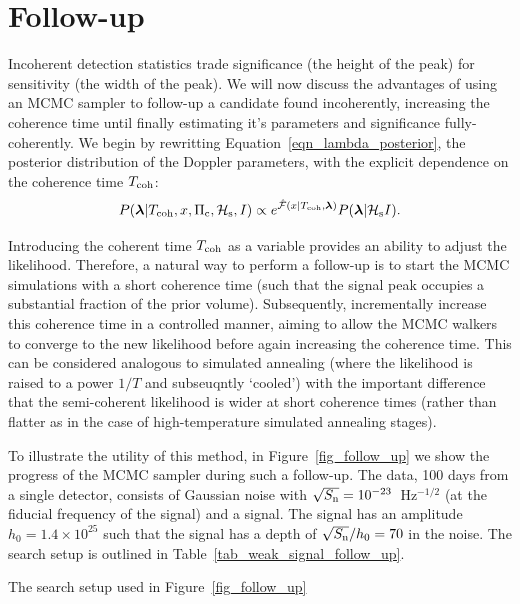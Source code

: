 \documentclass[aps, prd, twocolumn, superscriptaddress, floatfix, showpacs, nofootinbib, longbibliography]{revtex4-1}
\begin{document}
\section{Follow-up}
\label{sec_follow_up}

Incoherent detection statistics trade significance (the height of the peak) for
sensitivity (the width of the peak). We will now discuss the advantages of
using an MCMC sampler to follow-up a candidate found incoherently, increasing
the coherence time until finally estimating it's parameters and significance
fully-coherently. We begin by rewritting Equation~\eqref{eqn_lambda_posterior},
the posterior distribution of the Doppler parameters, with the explicit
dependence on the coherence time $T_{\rm coh}$:
\begin{equation}
P(\boldsymbol{\mathbf{\lambda}} | T_{\rm coh}, x, \Pi_{\rm c}, \mathcal{H}_{\rm s}, I)
\propto e^{\hat{{\mathcal{F}}}(x| T_{\rm coh}, \boldsymbol{\mathbf{\lambda}})} P(\boldsymbol{\mathbf{\lambda}}| \mathcal{H}_{\rm s} I).
\end{equation}

Introducing the coherent time $T_{\rm coh}$ as a variable provides an ability to
adjust the likelihood. Therefore, a natural way to perform a follow-up is to
start the MCMC simulations with a short coherence time (such that the signal
peak occupies a substantial fraction of the prior volume). Subsequently,
incrementally increase this coherence time in a controlled manner, aiming to
allow the MCMC walkers to converge to the new likelihood before again
increasing the coherence time. This can be considered analogous to simulated
annealing (where the likelihood is raised to a power $1/T$ and subseuqntly
`cooled') with the important difference that the semi-coherent likelihood is
wider at short coherence times (rather than flatter as in the case of
high-temperature simulated annealing stages).

To illustrate the utility of this method, in Figure~\ref{fig_follow_up} we show
the progress of the MCMC sampler during such a follow-up. The data, 100 days
from a single detector, consists of Gaussian noise with
$\sqrt{S_{\rm n}}=10^{-23}$~Hz$^{-1/2}$ (at the fiducial frequency of the signal) and
a signal. The signal has an amplitude $h_0=1.4\times10^{25}$ such that the
signal has a depth of $\sqrt{S_{\rm n}}/h_0=70$ in the noise. The search setup is
outlined in Table~\ref{tab_weak_signal_follow_up}.

\begin{table}[htb]
\caption{The search setup used in Figure~\ref{fig_follow_up}}
\label{tab_weak_signal_follow_up}

\end{table}
\end{document}
